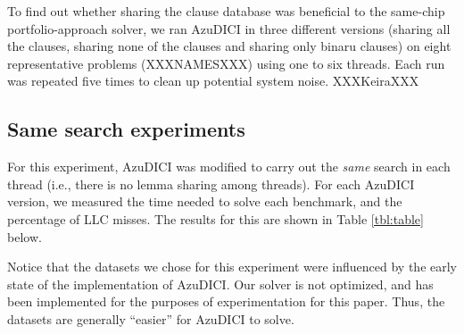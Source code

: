 
To find out whether sharing the clause database was beneficial to the
same-chip portfolio-approach solver, we ran AzuDICI in three different
versions (sharing all the clauses, sharing none of the clauses and
sharing only binaru clauses) on eight representative problems
(XXXNAMESXXX) using one to six threads. Each run was repeated five
times to clean up potential system noise. XXXKeiraXXX

\subsection{Same search experiments}
\label{sec:samesearch}

For this experiment, AzuDICI was modified to carry out the {\em same}
search in each thread (i.e., there is no lemma sharing among
threads). For each AzuDICI version, we measured the time needed to
solve each benchmark, and the percentage of LLC misses. The results
for this are shown in Table \ref{tbl:table} below.

Notice that the datasets we chose for this experiment were influenced
by the early state of the implementation of AzuDICI. Our solver is not
optimized, and has been implemented for the purposes of
experimentation for this paper. Thus, the datasets are generally
``easier'' for AzuDICI to solve.

